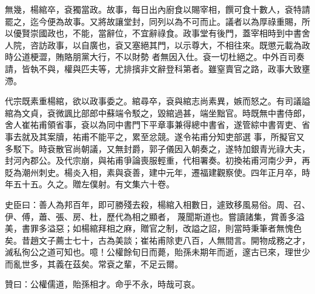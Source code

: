 \begin{pinyinscope}
 無幾，楊綰卒，袞獨當政。故事，每日出內廚食以賜宰相，饌可食十數人，袞特請罷之，迄今便為故事。又將故讓堂封，同列以為不可而止。議者以為厚祿重賜，所以優賢崇國政也，不能，當辭位，不宜辭祿食。政事堂有後門，蓋宰相時到中書舍人院，咨訪政事，以自廣也，袞又塞絕其門，以示尊大，不相往來。既懲元載為政時公道梗澀，賄賂朋黨大行，不以財勢
 者無因入仕。袞一切杜絕之。中外百司奏請，皆執不與，權與匹夫等，尤排擯非文辭登科第者。雖窒賣官之路，政事大致壅滯。



 代宗既素重楊綰，欲以政事委之。綰尋卒，袞與綰志尚素異，嫉而怒之。有司議謚綰為文貞，袞微諷比部郎中蘇端令駁之，毀綰過甚，端坐黜官。時既無中書侍郎，舍人崔祐甫領省事，袞以為同中書門下平章事兼得總中書省，遂管綜中書胥吏、省事去就及其案牘，祐甫不能平之，累至忿競。遂令祐甫分知吏部選
 事，所擬官又多駁下。時袞散官尚朝議，又無封爵，郭子儀因入朝奏之，遂特加銀青光祿大夫，封河內郡公。及代宗崩，與祐甫爭論喪服輕重，代相署奏。初換祐甫河南少尹，再貶為潮州刺史。楊炎入相，素與袞善，建中元年，遷福建觀察使。四年正月卒，時年五十五。久之。贈左僕射。有文集六十卷。



 史臣曰：善人為邦百年，即可勝殘去殺，楊綰入相數日，遽致移風易俗。周、召、伊、傅，蕭、張、房、杜，歷代為相之顯者，
 蔑聞斯道也。嘗讀諸集，賞善多溢美，書罪多溢惡；如楊綰拜相之麻，贈官之制，改謚之詔，則當時秉筆者無愧色矣。昔趙文子薦士七十，古為美談；崔祐甫除吏八百，人無間言。開物成務之才，滅私徇公之道可知也。噫！公權餘旬日而薨，貽孫未期年而逝，邃古已來，理世少而亂世多，其義在茲矣。常袞之輩，不足云爾。



 贊曰：公權儒道，貽孫相才。命乎不永，時哉可哀。



\end{pinyinscope}